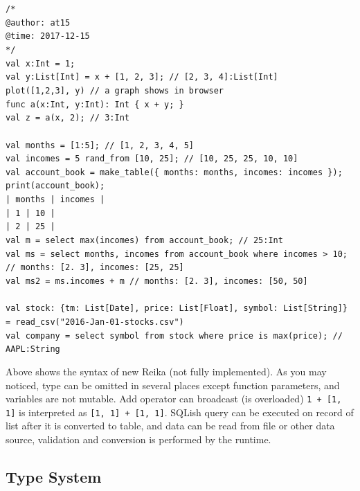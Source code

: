 \documentclass{article}
\begin{document}
\texttt{/* \\
@author: at15 \\
@time: 2017-12-15 \\
*/ \\
val x:Int = 1; \\
val y:List[Int] = x + [1, 2, 3]; // [2, 3, 4]:List[Int] \\
plot([1,2,3], y) // a graph shows in browser \\
func a(x:Int, y:Int): Int \{ x + y; \} \\
val z = a(x, 2); // 3:Int \\
\\
val months = [1:5]; // [1, 2, 3, 4, 5] \\
val incomes = 5 rand\_from [10, 25]; // [10, 25, 25, 10, 10] \\
val account\_book = make\_table(\{ months: months, incomes: incomes \}); \\
print(account\_book); \\
| months | incomes | \\
|   1    |   10    | \\
|   2    |   25    | \\
val m = select max(incomes) from account\_book; // 25:Int\\
val ms = select months, incomes from account\_book where incomes > 10; // {months: [2. 3], incomes: [25, 25]} \\
val ms2 = ms.incomes + m // {months: [2. 3], incomes: [50, 50]} \\
\\
val stock: \{tm: List[Date], price: List[Float], symbol: List[String]\} = read\_csv("2016-Jan-01-stocks.csv") \\
val company = select symbol from stock where price is max(price); // AAPL:String
}

Above shows the syntax of new Reika (not fully implemented).
As you may noticed, type can be omitted in several places except function parameters, and variables are not mutable.
Add operator can broadcast (is overloaded) \texttt{1 + [1, 1]} is interpreted as \texttt{[1, 1] + [1, 1]}.
SQLish query can be executed on record of list after it is converted to table,
and data can be read from file or other data source, validation and conversion is performed by the runtime.

\subsection{Type System}
\label{subsec:type-system}
\end{document}
